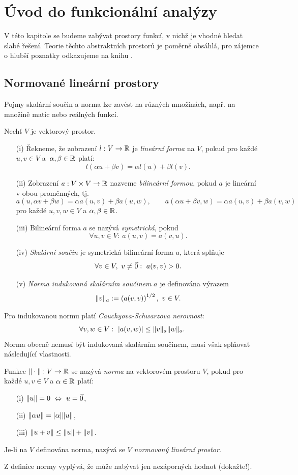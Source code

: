 \section{Úvod do funkcionální analýzy}


V této kapitole se budeme zabývat prostory funkcí, v nichž je vhodné hledat slabé řešení.
Teorie těchto abstraktních prostorů je poměrně obsáhlá, pro zájemce o hlubší poznatky odkazujeme na knihu \cite{rektorys1974variacni}.


\subsection{Normované lineární prostory}

Pojmy skalární součin a norma lze zavést na různých množinách, např. na množině matic nebo reálných funkcí.
\begin{df}
Nechť $V$ je vektorový prostor.
\begin{itemize}
\item[(i)] Řekneme, že zobrazení $l:V\rightarrow{\mathbb R}$ je \emph{lineární forma} na $V$, pokud pro každé $u,v\in V$ a~$\alpha,\beta\in{\mathbb R}$ platí:
\[ l(\alpha u+\beta v) = \alpha l(u) + \beta l(v). \]
\item[(ii)] Zobrazení $a:V\times V\rightarrow{\mathbb R}$ nazveme \emph{bilineární formou}, pokud $a$ je lineární v obou proměnných, tj.
\[ a(u,\alpha v+\beta w) = \alpha a(u,v) + \beta a(u,w), \qquad
 a(\alpha u+\beta v,w) = \alpha a(u,v) + \beta a(v,w) \]
pro každé $u,v,w\in V$ a $\alpha,\beta\in{\mathbb R}$.
\item[(iii)] Bilineární forma $a$ se nazývá \emph{symetrická}, pokud
\[ \forall u,v\in V:~a(u,v)=a(v,u). \]
\item[(iv)] \emph{Skalární součin} je symetrická bilineární forma $a$, která splňuje
\[ \forall v\in V,~v\neq \vec{0}:~a(v,v)>0. \]
\item[(v)] \emph{Norma indukovaná skalárním součinem} $a$ je definována výrazem
\[ \|v\|_a := \left(a(v,v)\right)^{1/2},~v\in V. \]
\end{itemize}
\end{df}
Pro indukovanou normu platí \emph{Cauchyova-Schwarzova nerovnost}:
\[ \forall v,w\in V: ~|a(v,w)| \le \|v\|_a\|w\|_a. \]
Norma obecně nemusí být indukovaná skalárním součinem, musí však splňovat následující vlastnosti.
\begin{df}
Funkce $\|\cdot\|:V\rightarrow\mathbb R$ se nazývá \emph{norma} na vektorovém prostoru $V$, pokud pro každé $u,v\in V$ a $\alpha\in\mathbb R$ platí:
\begin{itemize}
\item[(i)] $\|u\|=0 ~\Leftrightarrow~u=\vec 0$,
\item[(ii)] $\|\alpha u\|=|\alpha|\|u\|$,
\item[(iii)] $\|u+v\|\le\|u\|+\|v\|$.
\end{itemize}
Je-li na $V$ definována norma, nazývá se $V$ \emph{normovaný lineární prostor}.
\end{df}
Z definice normy vyplývá, že může nabývat jen nezáporných hodnot (dokažte!).


